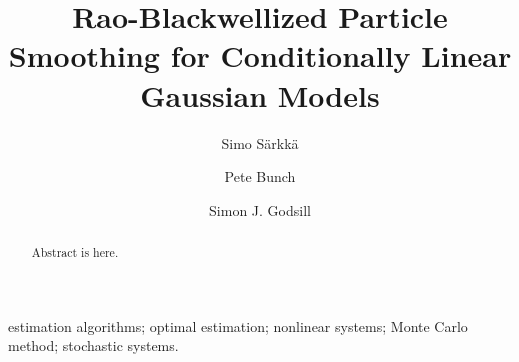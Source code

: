 \documentclass[twocolumn]{autart}    %
\begin{document}
\begin{frontmatter}





          

\title{Rao-Blackwellized Particle Smoothing for
Conditionally Linear Gaussian Models}


\author[First]{Simo S\"arkk\"a} 
\author[Second]{Pete Bunch} 
\author[Third]{Simon J. Godsill} 

\address[First]{Aalto University, P.O. Box
  12200. FI-00076 AALTO, Finland. (Tel: +358 50 512 4393; e-mail: simo.sarkka@aalto.fi)}
\address[Second]{University of Cambridge, Department of Engineering, Trumpington Street, Cambridge CB2 1PZ, UK (e-mail: pb404@cam.ac.uk)}
\address[Third]{University of Cambridge, Department of Engineering, Trumpington Street, Cambridge CB2 1PZ, UK (e-mail: sjg@cam.ac.uk)}


\begin{keyword}
estimation algorithms; optimal estimation; nonlinear systems;
Monte Carlo method; stochastic systems.
\end{keyword}

\begin{abstract}  %
Abstract is here.
\end{abstract}

\end{frontmatter}
\end{document}
